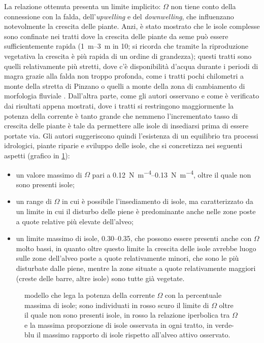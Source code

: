 La relazione ottenuta presenta un limite implicito: $\Omega$ non tiene conto della connessione con la falda, dell'\emph{upwelling} e del \emph{downwelling}, che influenzano notevolmente la crescita delle piante.
Anzi, è stato mostrato che le isole complesse sono confinate nei tratti dove la crescita delle piante da seme può essere sufficientemente rapida (\SIrange[range-phrase={-}, range-units = single]{1}{3}{\m} in \SI{10}{\anni}; si ricorda che tramite la riproduzione vegetativa la crescita è più rapida di un ordine di grandezza); questi tratti sono quelli relativamente più stretti, dove c'è disponibilità d'acqua durante i periodi di magra grazie alla falda non troppo profonda, come i tratti pochi chilometri a monte della stretta di Pinzano o quelli a monte della zona di cambiamento di morfologia fluviale .
Dall'altra parte, come gli autori osservano e come è verificato dai risultati appena mostrati, dove i tratti si restringono maggiormente la potenza della corrente è tanto grande che nemmeno l'incrementato tasso di crescita delle piante è tale da permettere alle isole di insediarsi prima di essere portate via.
Gli autori suggeriscono quindi l'esistenza di un equilibrio tra processi idrologici, piante riparie e sviluppo delle isole, che si concretizza nei seguenti aspetti (grafico in \cref{graph:omega-area-percentuale-linear-modello}):
%
\begin{itemize}
	\item un valore massimo di $\Omega$ pari a \SIrange[range-phrase={-}]{0.12}{0.13}{\newton\per\metre\tothe{4}}, oltre il quale non sono presenti isole;
	\item un range di $\Omega$ in cui è possibile l'insediamento di isole, ma caratterizzato da un limite in cui il disturbo delle piene è predominante anche nelle zone poste a quote relative più elevate dell'alveo;
	\item un limite massimo di isole, \numrange[range-phrase={-}]{0.30}{0.35}, che possono essere presenti anche con $\Omega$ molto bassi, in quanto oltre questo limite la crescita delle isole avrebbe luogo sulle zone dell'alveo poste a quote relativamente minori, che sono le più disturbate dalle piene, mentre la zone situate a quote relativamente maggiori (creste delle barre, altre isole) sono tutte già vegetate.
\end{itemize}
%
%
\begin{figure}
	\centering
	
	\caption[modello che lega la potenza della corrente con la percentuale massima di isole]{modello che lega la potenza della corrente $\Omega$ con la percentuale massima di isole; sono individuati in rosso scuro il limite di $\Omega$ oltre il quale non sono presenti isole, in rosso la relazione iperbolica tra $\Omega$ e la massima proporzione di isole osservata in ogni tratto, in verde-blu il massimo rapporto di isole rispetto all'alveo attivo osservato.}
	\label{graph:omega-area-percentuale-linear-modello}
\end{figure}
%
